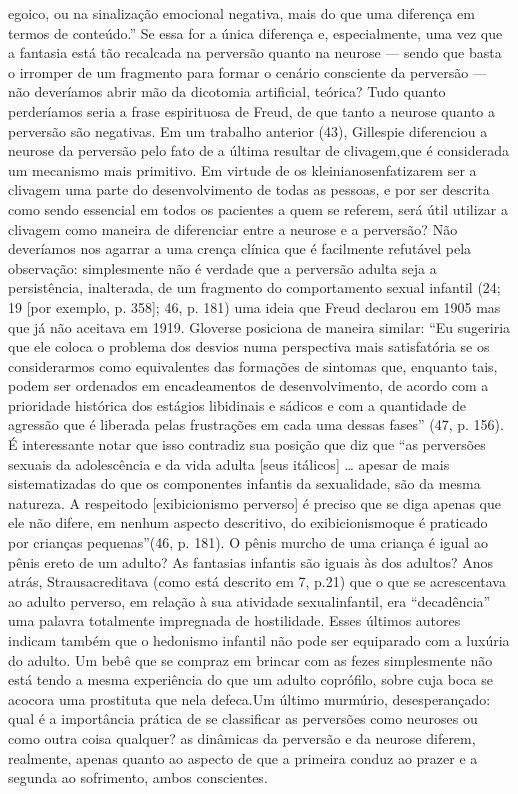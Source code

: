 \begin{enumerate}
{egoico, ou na sinalização emocional negativa, mais do que uma diferença
em termos de conteúdo.'' Se essa for a única diferença e,
especialmente, uma vez que a fantasia está tão recalcada na perversão
quanto na neurose --- sendo que basta o irromper de um fragmento para
formar o cenário consciente da perversão --- não deveríamos abrir mão
da dicotomia artificial, teórica? Tudo quanto perderíamos seria a frase
espirituosa de Freud, de que tanto a neurose quanto a perversão são
negativas. Em um trabalho anterior (43), Gillespie diferenciou a
neurose da perversão pelo fato de a última resultar de clivagem,\idxcliv[|nn] que é
considerada um mecanismo mais primitivo. Em virtude de os kleinianos\idxklein[|nn]
enfatizarem ser a clivagem uma parte do desenvolvimento de todas as
pessoas, e por ser descrita como sendo essencial em todos os pacientes
a quem se referem, será útil utilizar a clivagem como maneira de
diferenciar entre a neurose e a perversão? Não deveríamos nos
agarrar a uma crença clínica que é facilmente refutável pela
observação: simplesmente não é verdade que a perversão adulta seja a
persistência, inalterada, de um fragmento do comportamento sexual
infantil (24; 19 [por exemplo, p. 358]; 46, p. 181) uma ideia que Freud
declarou em 1905 mas que já não aceitava em 1919. Glover\idxglove[|nn] se posiciona
de maneira similar: ``Eu sugeriria que ele coloca o
problema dos desvios numa perspectiva mais satisfatória se os
considerarmos como equivalentes das formações de sintomas que, enquanto
tais, podem ser ordenados em encadeamentos de desenvolvimento, de
acordo com a prioridade histórica dos estágios libidinais e sádicos e
com a quantidade de agressão que é liberada pelas frustrações em cada
uma dessas fases'' (47, p. 156). É interessante notar que
isso contradiz sua posição que diz que ``as perversões
sexuais da adolescência e da vida adulta [seus itálicos] \ldots{} apesar de
mais sistematizadas do que os componentes infantis da sexualidade, são
da mesma natureza. A respeito\idxinfanexib[|nn] do [exibicionismo perverso] é preciso que
se diga apenas que ele não difere, em nenhum aspecto descritivo, do
exibicionismo\idxexibi[|nn] que é praticado por crianças pequenas''\idxexibiinfa[|nn] (46,
p. 181). O pênis murcho de uma criança é igual ao pênis ereto de um
adulto? As fantasias infantis são iguais às dos adultos? Anos atrás,
Straus\idxstraus[|nn] acreditava (como está descrito em 7, p.21) que o que se
acrescentava ao adulto perverso, em relação à sua atividade sexual\idxinfansexua[|nn]
infantil, era ``decadência'' uma palavra
totalmente impregnada de hostilidade. Esses últimos autores indicam
também que o hedonismo infantil não pode ser equiparado com a luxúria
do adulto. Um bebê que se compraz em brincar com as fezes simplesmente
não está tendo a mesma experiência do que um adulto coprófilo, sobre
cuja boca se acocora uma prostituta que nela defeca.\idxcopro[|nn] Um último
murmúrio, desesperançado: qual é a importância prática de se
classificar as perversões como neuroses ou como outra coisa qualquer?}
as dinâmicas da perversão e da neurose diferem, realmente, apenas
quanto ao aspecto de que a primeira conduz ao prazer e a segunda ao
sofrimento, ambos conscientes.


\end{enumerate}
